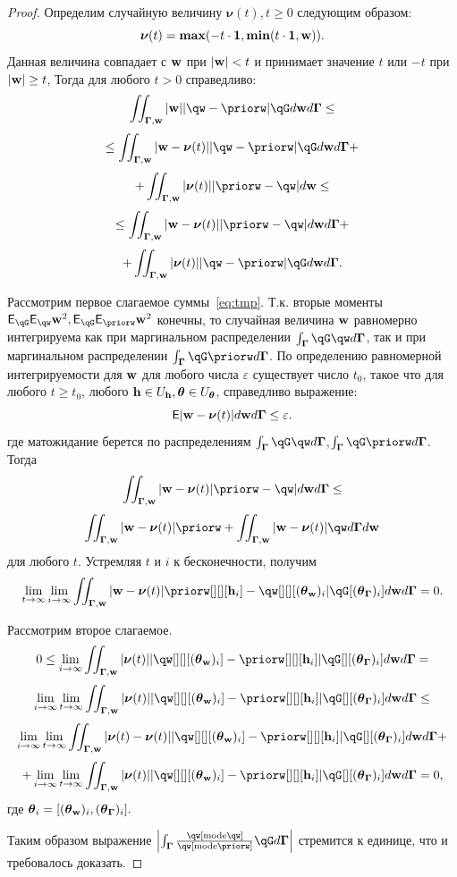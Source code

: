 \begin{proof}
Определим случайную величину $\boldsymbol{\nu}(t), t \geq 0$ следующим образом:
\[
    \boldsymbol{\nu}(t) = \boldsymbol{\max}(-t \cdot \mathbf{1}, \boldsymbol{\min}(t \cdot \mathbf{1}, \mathbf{w})).
\]
Данная величина совпадает с $\mathbf{w}$ при $|\mathbf{w}| < t$ и принимает значение $t$ или $-t$ при $|\mathbf{w}| \geq t$,
Тогда для любого $t>0$ справедливо:
\[
    \iint_{\G,\w} |\w| |\qw - \priorw|\qG d\w d\G \leq
\]
\[ 
\leq  \iint_{\G,\w} |\w -\boldsymbol{\nu}(t)| |\qw - \priorw|\qG d\w d\G   +
\]
\[
 +    \iint_{\G,\w} |\boldsymbol{\nu}(t)||\priorw-\qw|d\w \leq
\]
\begin{equation}
\label{eq:tmp}
    \leq    \iint_{\G,\w} |\w -\boldsymbol{\nu}(t)||\priorw -\qw| d\w d\G   +
\end{equation}
\[ +      \iint_{\G,\w} |\boldsymbol{\nu}(t)| |\qw - \priorw|\qG d\w d\G.
\]

Рассмотрим первое слагаемое суммы~\eqref{eq:tmp}. Т.к. вторые моменты $\E_{\qG}\E_{\qw} \w^2, \E_{\qG}\E_{\priorw} \w^2$ конечны, то случайная величина $\mathbf{w}$ равномерно интегрируема как при маргинальном распределении $\int_{\G}\qG\qw d\G$, так и при маргинальном распределении $\int_{\G}\qG\priorw d\G$.
По определению равномерной интегрируемости для $\mathbf{w}$ для любого числа $\varepsilon$ существует число $t_0$, такое что для любого $t \geq t_0$, любого $\mathbf{h} \in U_{\mathbf{h}}, \boldsymbol{\theta} \in U_{\boldsymbol{\theta}}$,  справедливо выражение:
\[
    \mathsf{E}|\mathbf{w} - \boldsymbol{\nu}(t)| d\mathbf{w} d\boldsymbol{\Gamma} \leq \varepsilon.
\]
где матожидание берется по  распределениям $\int_{\G}\qG\qw d\G$,$\int_{\G}\qG\priorw d\G$. Тогда
\[
   \iint_{\G,\w} |\w -\boldsymbol{\nu}(t)|\priorw  - \qw| d\w d\G   \leq  
\]
\[
  \iint_{\G,\w} |\w -\boldsymbol{\nu}(t)|\priorw  +   \iint_{\G,\w} |\w -\boldsymbol{\nu}(t)|\qw d\G d\w
\]
для любого $t$. Устремляя $t$ и $i$ к бесконечности, получим $$\lim_{t \to \infty}  \lim_{i \to \infty}    \iint_{\G,\w} |\w -\boldsymbol{\nu}(t)|\priorw[][][\h_i]  - \qw[][][(\tetaw)_i| \qG[(\tetaG)_i] d\w d\G = 0.$$

Рассмотрим второе слагаемое.
$$
0 \leq \lim_{i \to \infty} \iint_{\G,\w} |\boldsymbol{\nu}(t)| |\qw[][][(\tetaw)_i] - \priorw[][][\h_i]|\qG[][(\tetaG)_i] d\w d\G = 
$$
\[
\lim_{i \to \infty}\lim_{t \to \infty} \iint_{\G,\w} |\boldsymbol{\nu}(t)| |\qw[][][(\tetaw)_i] - \priorw[][][\h_i]|\qG[][(\tetaG)_i] d\w d\G \leq
\]
\[
  \lim_{i \to \infty}\lim_{t \to \infty}  \iint_{\G,\w} |\boldsymbol{\nu}(t) -\boldsymbol{\nu}(t)| |\qw[][][(\tetaw)_i] - \priorw[][][\h_i]|\qG[][(\tetaG)_i] d\w d\G   + 
\]
\[
+   \lim_{i \to \infty}\lim_{t \to \infty}    \iint_{\G,\w} |\boldsymbol{\nu}(t)| |\qw[][][(\tetaw)_i] - \priorw[][][\h_i]|\qG[][(\tetaG)_i] d\w d\G =0,
\]
где $\boldsymbol{\theta}_i = [(\boldsymbol{\theta}_\mathbf{w})_i, (\boldsymbol{\theta}_{\boldsymbol{\Gamma}})_i].$

Таким образом выражение $\left|\int_{\G} \frac{\qw[\text{mode}\qw]}{\qw[\text{mode}\priorw]}\qG d\G \right|$ стремится к единице, что и требовалось доказать.
\end{proof}

